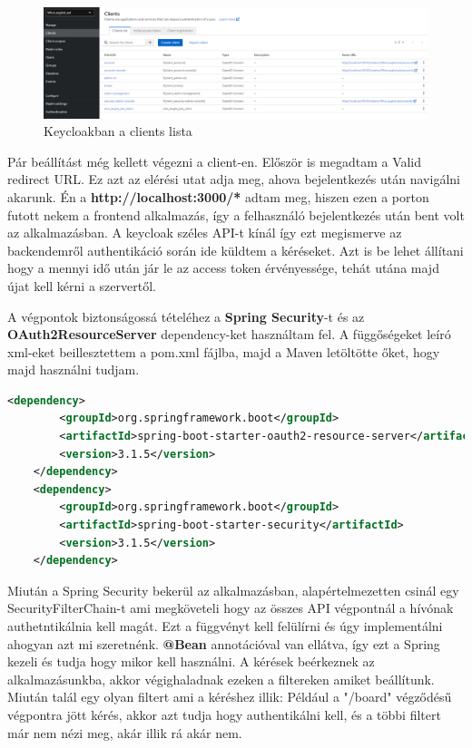 \documentclass[a4paper,twoside]{article}
\begin{document}
\begin{figure}[h]
	\caption{Keycloakban a clients lista}
	\centering
	\includegraphics[scale=0.5]{keycloak-cients}
\end{figure}
Pár beállítást még kellett végezni a client-en. Először is megadtam a Valid redirect URL. Ez azt az elérési utat adja meg, ahova bejelentkezés után navigálni akarunk. Én 
a \textbf{http://localhost:3000/*} adtam meg, hiszen ezen a porton futott nekem a frontend alkalmazás, így a felhasználó bejelentkezés után bent volt az alkalmazásban. A keycloak
széles API-t kínál így ezt megismerve az backendemről authentikáció során ide küldtem a kéréseket. Azt is be lehet állítani hogy a mennyi idő után jár le az access token érvényessége, tehát utána majd újat kell kérni a szervertől. 

A végpontok biztonságossá tételéhez a \textbf{Spring Security}-t és az \textbf{OAuth2ResourceServer} dependency-ket használtam fel. A függőségeket leíró xml-eket beillesztettem a pom.xml fájlba, majd a Maven letöltötte őket, hogy majd használni tudjam. 

\begin{lstlisting}[language=XML, caption={A pom.xml fileban a függőségek},captionpos=b]
	<dependency>
		<groupId>org.springframework.boot</groupId>
		<artifactId>spring-boot-starter-oauth2-resource-server</artifactId>
		<version>3.1.5</version>
	</dependency>
	<dependency>
		<groupId>org.springframework.boot</groupId>
		<artifactId>spring-boot-starter-security</artifactId>
		<version>3.1.5</version>
	</dependency>
\end{lstlisting}

Miután a Spring Security bekerül az alkalmazásban, alapértelmezetten csinál egy SecurityFilterChain-t ami megköveteli hogy az összes API végpontnál
a hívónak authetntikálnia kell magát. Ezt a függvényt kell felülírni és úgy implementálni ahogyan azt mi szeretnénk. \textbf{@Bean} annotációval van ellátva,
így ezt a Spring kezeli és tudja hogy mikor kell használni. A kérések beérkeznek az alkalmazásunkba, akkor végighaladnak ezeken a filtereken amiket beállítunk. Miután talál 
egy olyan filtert ami a kéréshez illik: Például a "/board" végződésű végpontra jött kérés, akkor azt tudja hogy authentikálni kell, és a többi filtert már nem nézi meg, akár illik rá akár nem. 
\end{document}
